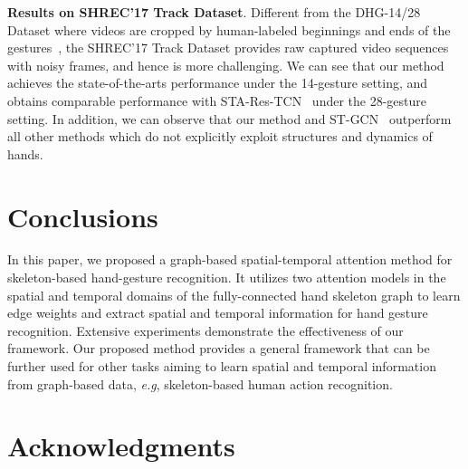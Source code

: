 \documentclass{bmvc2k}
\def\eg{\emph{e.g}\bmvaOneDot}
\begin{document}
\textbf{Results on SHREC'17 Track Dataset}. Different from the DHG-14/28 Dataset where videos are cropped by human-labeled beginnings and ends of the gestures~\cite{de2016skeleton}, the SHREC'17 Track Dataset provides raw captured video sequences with noisy frames, and hence is more challenging. We can see that our method achieves the state-of-the-arts performance under the 14-gesture setting, and obtains comparable performance with STA-Res-TCN~\cite{hou2018spatial} under the 28-gesture setting. In addition, we can observe that our method and ST-GCN~\cite{yan2018spatial} outperform all other methods which do not explicitly exploit structures and dynamics of hands.

%
 \section{Conclusions}

In this paper, we proposed a graph-based spatial-temporal attention method for skeleton-based hand-gesture recognition. It utilizes two attention models in the spatial and temporal domains of the fully-connected hand skeleton graph to learn edge weights and extract spatial and temporal information for hand gesture recognition. Extensive experiments demonstrate
the effectiveness of our framework. Our proposed method provides a general framework that can be further used for other tasks aiming to learn spatial and temporal information from graph-based data, \eg, skeleton-based human action recognition.

\section{Acknowledgments}
\end{document}
